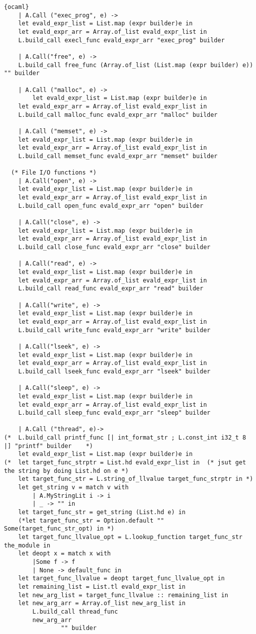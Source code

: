 \begin{lstlisting}{ocaml}
    | A.Call ("exec_prog", e) ->
	let evald_expr_list = List.map (expr builder)e in
	let evald_expr_arr = Array.of_list evald_expr_list in
	L.build_call execl_func evald_expr_arr "exec_prog" builder

    | A.Call("free", e) ->
	L.build_call free_func (Array.of_list (List.map (expr builder) e)) "" builder

    | A.Call ("malloc", e) ->
      	let evald_expr_list = List.map (expr builder)e in
	let evald_expr_arr = Array.of_list evald_expr_list in
	L.build_call malloc_func evald_expr_arr "malloc" builder

    | A.Call ("memset", e) ->
	let evald_expr_list = List.map (expr builder)e in
	let evald_expr_arr = Array.of_list evald_expr_list in
	L.build_call memset_func evald_expr_arr "memset" builder

  (* File I/O functions *)
    | A.Call("open", e) ->
	let evald_expr_list = List.map (expr builder)e in
	let evald_expr_arr = Array.of_list evald_expr_list in
	L.build_call open_func evald_expr_arr "open" builder

    | A.Call("close", e) ->
	let evald_expr_list = List.map (expr builder)e in
	let evald_expr_arr = Array.of_list evald_expr_list in
  	L.build_call close_func evald_expr_arr "close" builder

    | A.Call("read", e) ->
	let evald_expr_list = List.map (expr builder)e in
	let evald_expr_arr = Array.of_list evald_expr_list in
	L.build_call read_func evald_expr_arr "read" builder

    | A.Call("write", e) ->
	let evald_expr_list = List.map (expr builder)e in
	let evald_expr_arr = Array.of_list evald_expr_list in
	L.build_call write_func evald_expr_arr "write" builder

    | A.Call("lseek", e) ->
	let evald_expr_list = List.map (expr builder)e in
	let evald_expr_arr = Array.of_list evald_expr_list in
	L.build_call lseek_func evald_expr_arr "lseek" builder

    | A.Call("sleep", e) ->
	let evald_expr_list = List.map (expr builder)e in
	let evald_expr_arr = Array.of_list evald_expr_list in
	L.build_call sleep_func evald_expr_arr "sleep" builder

    | A.Call ("thread", e)->
(*	L.build_call printf_func [| int_format_str ; L.const_int i32_t 8 |] "printf" builder	*)
	let evald_expr_list = List.map (expr builder)e in
(*	let target_func_strptr = List.hd evald_expr_list in  (* jsut get the string by doing List.hd on e *)
	let target_func_str = L.string_of_llvalue target_func_strptr in *)
	let get_string v = match v with
		| A.MyStringLit i -> i
		| _ -> "" in
	let target_func_str = get_string (List.hd e) in
	(*let target_func_str = Option.default "" Some(target_func_str_opt) in *)
	let target_func_llvalue_opt = L.lookup_function target_func_str the_module in
	let deopt x = match x with
		|Some f -> f
		| None -> default_func in
	let target_func_llvalue = deopt target_func_llvalue_opt in
	let remaining_list = List.tl evald_expr_list in
	let new_arg_list = target_func_llvalue :: remaining_list in
	let new_arg_arr = Array.of_list new_arg_list in
		L.build_call thread_func
		new_arg_arr	
                "" builder


\end{lstlisting}
